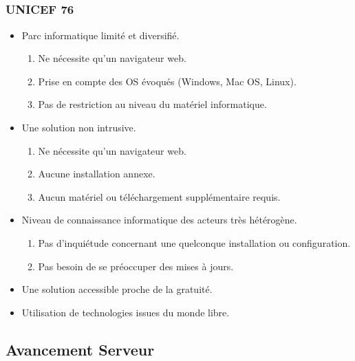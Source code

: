 \subsection{} %

\begin{frame}
  \frametitle{UNICEF 76}
  \begin{itemize}
    \item Parc informatique limité et diversifié.
      \begin{enumerate}
        \item Ne nécessite qu'un navigateur web.
        \item Prise en compte des OS évoqués (Windows, Mac OS, Linux).
        \item Pas de restriction au niveau du matériel informatique.
      \end{enumerate}
    \item Une solution non intrusive.
      \begin{enumerate}
        \item Ne nécessite qu'un navigateur web.
        \item Aucune installation annexe.
        \item Aucun matériel ou téléchargement supplémentaire requis.
      \end{enumerate}
    \item Niveau de connaissance informatique des acteurs très hétérogène.
      \begin{enumerate}
        \item Pas d'inquiétude concernant une quelconque installation ou configuration.
        \item Pas besoin de se préoccuper des mises à jours.  
      \end{enumerate}
    \item Une solution accessible proche de la gratuité.
    \item Utilisation de technologies issues du monde libre.
  \end{itemize}
\end{frame}

\subsection{Avancement Serveur}


\speaker{\Matthieu}
\subsection{}


